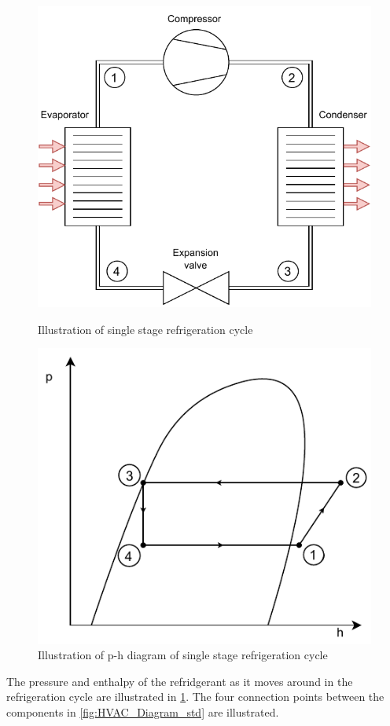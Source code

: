 \begin{figure}[h]
	\centering
	\begin{minipage}{0.5\textwidth}
		\centering
		\includegraphics[width=1\textwidth]{Graphics/HVAC_Diagram_std.pdf} %
		\caption{Illustration of single stage refrigeration cycle}
		\label{fig:HVAC_Diagram_std}
	\end{minipage}\hfill
	\begin{minipage}{0.5\textwidth}
		\centering
		\includegraphics[width=1\textwidth]{Graphics/p-h_diagram_std} %
		\caption{Illustration of p-h diagram of single stage refrigeration cycle}
		\label{fig:p-h_diagram_std}
	\end{minipage}
\end{figure}
The pressure and enthalpy of the refridgerant as it moves around in the refrigeration cycle are illustrated in \cref{fig:p-h_diagram_std}. The four connection points between the components in \cref{fig:HVAC_Diagram_std} are illustrated. 

